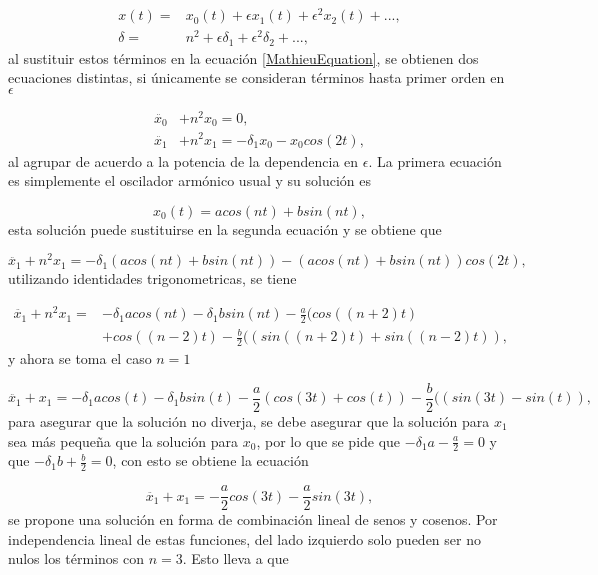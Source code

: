 \documentclass[a4paper,10pt]{report}
\begin{document}
\begin{align}
x(t)=& x_0(t) + \epsilon x_1(t) + \epsilon^2 x_2(t) + ... , \\
\delta =& n^2 + \epsilon \delta_1 + \epsilon^2 \delta_2 + ..., 
\end{align} al sustituir estos términos en la ecuación \eqref{MathieuEquation}, se obtienen dos ecuaciones distintas, si únicamente se consideran términos hasta primer orden en $\epsilon$

\begin{align}
\ddot{x_0}& + n^2x_0 = 0, \\
\ddot{x_1}& + n^2x_1 = -\delta_1x_0 -x_0cos(2t) ,
\end{align} al agrupar de acuerdo a la potencia de la dependencia en $\epsilon$. La primera ecuación es simplemente el oscilador armónico usual y su solución es

\begin{equation}
x_0(t) = a cos(nt) + b sin(nt),
\end{equation} esta solución puede sustituirse en la segunda ecuación y se obtiene que

\begin{equation}
\ddot{x_1} + n^2x_1 = -\delta_1(a cos(nt) + b sin(nt)) -(a cos(nt) + b sin(nt))cos(2t),
\end{equation} utilizando identidades trigonometricas, se tiene

\begin{align}
\ddot{x_1} + n^2x_1 =& \nonumber -\delta_1a cos(nt) -\delta_1b sin(nt) -\frac{a}{2}(cos((n+2)t)\\
 &+cos((n-2)t) - \frac{b}{2} ((sin((n+2)t)+sin((n-2)t)),
\end{align} y ahora se toma el caso $n=1$

\begin{equation}
\ddot{x_1} + x_1 = -\delta_1a cos(t) -\delta_1b sin(t) -\frac{a}{2}(cos(3t)+cos(t)) - \frac{b}{2} ((sin(3t)-sin(t)),
\end{equation} para asegurar que la solución no diverja, se debe asegurar que la solución para $x_1$ sea más pequeña que la solución para $x_0$, por lo que se pide que $-\delta_1a - \frac{a}{2}=0$ y que $-\delta_1b + \frac{b}{2}=0$, con esto se obtiene la ecuación

\begin{equation}
\ddot{x_1} + x_1 = -\frac{a}{2}cos(3t)-\frac{a}{2}sin(3t),
\end{equation} se propone una solución en forma de combinación lineal de senos y cosenos. Por independencia lineal de estas funciones, del lado izquierdo solo pueden ser no nulos los términos con $n=3$. Esto lleva a que
\end{document}
